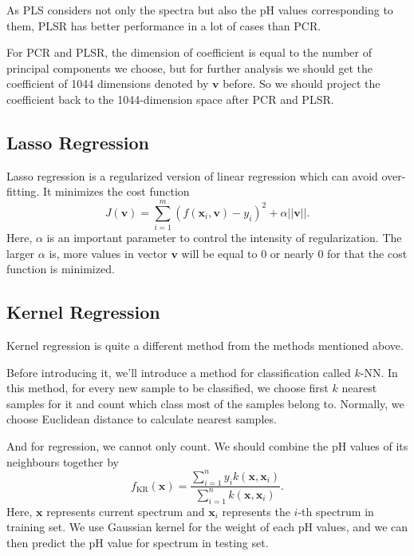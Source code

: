 \documentclass[a4paper]{article}
\newcommand{\bfv}{\mathbf{v}}
\newcommand{\bfx}{\mathbf{x}}
\begin{document}
As PLS considers not only the spectra but also the pH values corresponding to them, PLSR has better performance in a lot of cases than PCR.

\vspace{10pt}

For PCR and PLSR, the dimension of coefficient is equal to the number of principal components we choose, but for further analysis we should get the coefficient of 1044 dimensions denoted by $\bfv$ before. So we should project the coefficient back to the 1044-dimension space after PCR and PLSR.

\subsection{Lasso Regression}
Lasso regression \cite{tibshirani1996regression} is a regularized version of linear regression which can avoid over-fitting. It minimizes the cost function
\begin{equation}
J(\bfv)=\sum_{i=1}^m (f(\bfx_i,\bfv)-y_i)^2+\alpha ||\bfv||.
\end{equation}
Here, $\alpha$ is an important parameter to control the intensity of regularization. The larger $\alpha$ is, more values in vector $\bfv$ will be equal to 0 or nearly 0 for that the cost function is minimized.
\subsection{Kernel Regression}
Kernel regression \cite{nadaraya1964estimating} is quite a different method from the methods mentioned above.

Before introducing it, we'll introduce a method for classification called $k$-NN. In this method, for every new sample to be classified, we choose first $k$ nearest samples for it and count which class most of the samples belong to. Normally, we choose Euclidean distance to calculate nearest samples.

And for regression, we cannot only count. We should combine the pH values of its neighbours together by
\begin{equation}
f_{\mathrm{KR}}(\bfx) = \frac{\displaystyle \sum_{i=1}^n y_ik(\bfx,\bfx_i)}{\displaystyle \sum_{i=1}^n k(\bfx,\bfx_i)}.
\end{equation}
Here, $\bfx$ represents current spectrum and $\bfx_i$ represents the $i$-th spectrum in training set. We use Gaussian kernel for the weight of each pH values, and we can then predict the pH value for spectrum in testing set.
\end{document}
